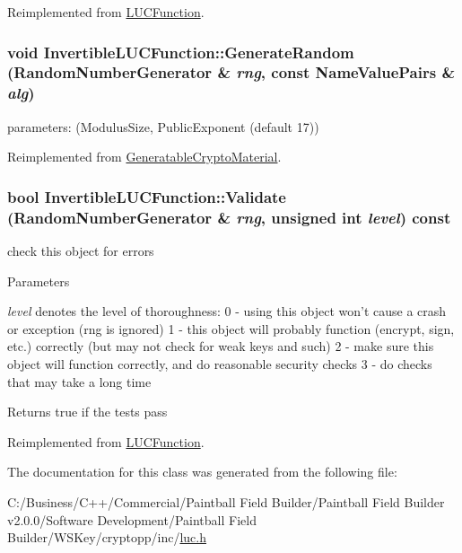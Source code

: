 Reimplemented from \hyperlink{class_l_u_c_function_af6a95ed660e53a5fa07841f139d43ccf}{LUCFunction}.\hypertarget{class_invertible_l_u_c_function_af846ecc0f5e8d17267544920bc39f233}{
\subsubsection[{GenerateRandom}]{\setlength{\rightskip}{0pt plus 5cm}void InvertibleLUCFunction::GenerateRandom ({\bf RandomNumberGenerator} \& {\em rng}, \/  const {\bf NameValuePairs} \& {\em alg})}}
\label{class_invertible_l_u_c_function_af846ecc0f5e8d17267544920bc39f233}
parameters: (ModulusSize, PublicExponent (default 17)) 

Reimplemented from \hyperlink{class_generatable_crypto_material_abe368b52db1ca7079b690f2d6e605f7a}{GeneratableCryptoMaterial}.\hypertarget{class_invertible_l_u_c_function_ad6390a95a003eceef45cc238f538c4d8}{
\subsubsection[{Validate}]{\setlength{\rightskip}{0pt plus 5cm}bool InvertibleLUCFunction::Validate ({\bf RandomNumberGenerator} \& {\em rng}, \/  unsigned int {\em level}) const}}
\label{class_invertible_l_u_c_function_ad6390a95a003eceef45cc238f538c4d8}


check this object for errors 
\begin{DoxyParams}{Parameters}
\item[{\em level}]denotes the level of thoroughness: 0 -\/ using this object won't cause a crash or exception (rng is ignored) 1 -\/ this object will probably function (encrypt, sign, etc.) correctly (but may not check for weak keys and such) 2 -\/ make sure this object will function correctly, and do reasonable security checks 3 -\/ do checks that may take a long time \end{DoxyParams}
\begin{DoxyReturn}{Returns}
true if the tests pass 
\end{DoxyReturn}


Reimplemented from \hyperlink{class_l_u_c_function_a9bc1b75db5e2b09dd2d7cbf0e9801bf8}{LUCFunction}.

The documentation for this class was generated from the following file:\begin{DoxyCompactItemize}
\item 
C:/Business/C++/Commercial/Paintball Field Builder/Paintball Field Builder v2.0.0/Software Development/Paintball Field Builder/WSKey/cryptopp/inc/\hyperlink{luc_8h}{luc.h}\end{DoxyCompactItemize}
